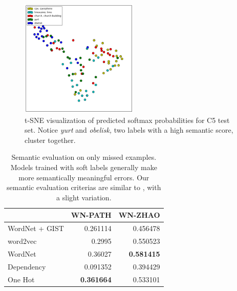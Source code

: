 


\begin{figure}[!tb]
  \centering
  \includegraphics[width=0.5\textwidth]{figs/tsne.png}
  \caption{
      t-SNE visualization of predicted softmax probabilities for C5 test set.
      Notice \emph{yurt} and \emph{obelisk,} two labels with a high semantic
      score, cluster together.
  }
  \label{fig:tsne}
\end{figure}

\begin{table}[!tb]
    \centering
    \begin{tabular}{lrr}
         & WN-PATH & WN-ZHAO\\
        \hline
        WordNet + GIST & 0.261114 & 0.456478\\
        word2vec & 0.2995 & 0.550523\\
        WordNet & 0.36027 & \textbf{0.581415}\\
        Dependency & 0.091352 & 0.394429\\
        One Hot & \textbf{0.361664} & 0.533101\\
    \end{tabular}
  \caption{
      Semantic evaluation on only missed examples. Models trained
      with soft labels generally make more semantically meaningful errors. Our
      semantic evaluation criterias are similar to \cite{zhao2011large}, with a
      slight variation.
  }
  \label{tbl:semantic_misses}
\end{table}

